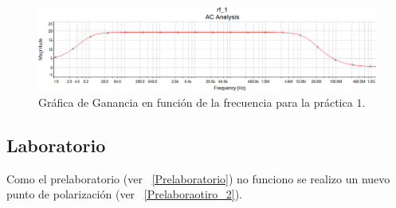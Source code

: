 \documentclass[11pt,graphicx,caption,rotating]{article}
\begin{document}
\begin{figure}[H]
	\centering
		\includegraphics[scale=0.4]{simulation_lab_1.png}
	\caption{Gráfica de Ganancia en función de la frecuencia para la práctica $1$.}
	\label{fig3}
\end{figure}

\subsection{Laboratorio}
\noindent
Como el prelaboratorio (ver  ~\ref{Prelaboratorio}) no funciono se realizo un nuevo punto de polarización (ver ~\ref{Prelaboraotiro_2}).
\end{document}

